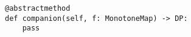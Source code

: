 \par\begin{minipage}{60ex}
\begin{verbatim}
@abstractmethod
def companion(self, f: MonotoneMap) -> DP:
    pass
\end{verbatim}
\end{minipage}\par